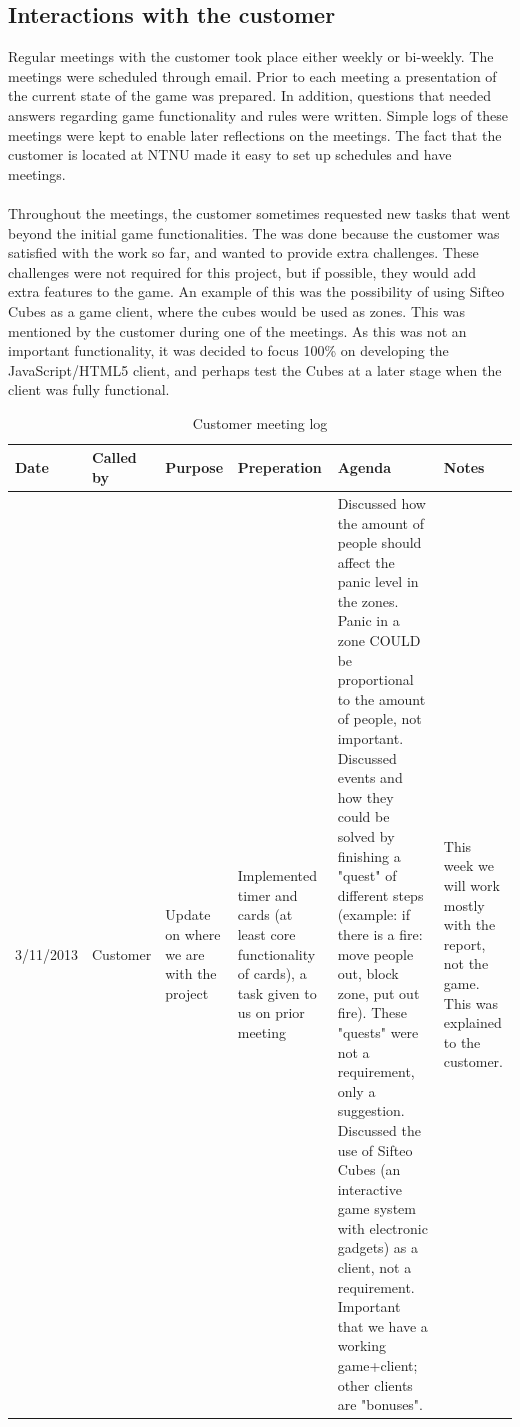 \subsection{Interactions with the customer}
Regular meetings with the customer took place either weekly or bi-weekly. The meetings were scheduled through email. Prior to each meeting a presentation of the current state of the game was prepared. In addition, questions that needed answers regarding game functionality and rules were written. Simple logs of these meetings were kept to enable later reflections on the meetings. The fact that the customer is located at NTNU made it easy to set up schedules and have meetings.\\
\\
Throughout the meetings, the customer sometimes requested new tasks that went beyond the initial game functionalities. The was done because the customer was satisfied with the work so far, and wanted to provide extra challenges. These challenges were not required for this project, but if possible, they would add extra features to the game. An example of this was the possibility of using Sifteo Cubes as a game client, where the cubes would be used as zones. This was mentioned by the customer during one of the meetings. As this was not an important functionality, it was decided to focus 100\% on developing the JavaScript/HTML5 client, and perhaps test the Cubes at a later stage when the client was fully functional.



\begin{table}[H]
{\scriptsize
\begin{tabular}{|p{1.9cm}|p{1.9cm}|p{1.9cm}|p{3cm}|p{3.5cm}|p{3.5cm}|}
\hline
	\textbf{Date} & \textbf{Called by} & \textbf{Purpose} & \textbf{Preperation}
	 	& \textbf{Agenda} & \textbf{Notes} 
\\ \hline
	3/11/2013 & Customer & Update on where we are with the project
		& Implemented timer and cards (at least core functionality of cards), 
a task given to us on prior meeting 
		& Discussed how the amount of people should affect the panic level in 
the zones. Panic in a zone COULD be proportional to the amount of people, not 
important. Discussed events and how they could be solved by finishing a "quest" 
of different steps (example: if there is a fire: move people out, block zone, 
put out fire). These "quests" were not a requirement, only a suggestion. 
Discussed the use of Sifteo Cubes (an interactive game system with electronic 
gadgets) as a client, not a requirement. Important that we have a working 
game+client; other clients are "bonuses". 
		& This week we will work mostly with the report, not the game. This was explained to the customer.
\\\hline
\end{tabular}
}
\caption{Customer meeting log}
\label{fig:CustomerMeetingLog}
\end{table}

